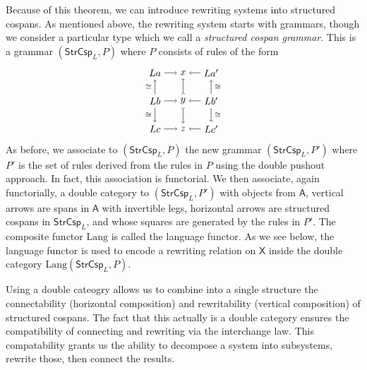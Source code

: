 \documentclass{amsart}
\newcommand{\iso}{\cong}
\newcommand{\A}{\cat{A}}
\newcommand{\X}{\cat{X}}
\newcommand{\StrCsp}{\cat{StrCsp}}
\newcommand{\Lang}{\mathrm{Lang}}
\newcommand{\cat}[1]{\mathsf{#1}}
\theoremstyle{remark}
\theoremstyle{definition}
\begin{document}
Because of this theorem, we can introduce rewriting systems into
structured cospans.  As mentioned above, the rewriting system starts
with grammars, though we consider a particular type which we call a
\emph{structured cospan grammar}.  This is a grammar
$ ( \StrCsp_L , P ) $ where $ P $ consists of rules of the form
%
 \[
   \begin{tikzpicture}
    \begin{scope}
        \node (1) at (0,2) {\( La \)};
        \node (2) at (1,2) {\( x \)};
        \node (3) at (2,2) {\( La' \)};
        \node (4) at (0,1) {\( Lb \)};
        \node (5) at (1,1) {\( y \)};
        \node (6) at (2,1) {\( Lb' \)};
        \node (7) at (0,0) {\( Lc \)};
        \node (8) at (1,0) {\( z \)};
        \node (9) at (2,0) {\( Lc' \)};
        \draw [->] (1) to node []
          {\scriptsize{\( \)}} (2);
        \draw [->] (3) to node []
          {\scriptsize{\( \)}} (2);
        \draw [->] (4) to node []
          {\scriptsize{\( \)}} (5);
        \draw [->] (6) to node []
          {\scriptsize{\( \)}} (5);
        \draw [->] (7) to node []
          {\scriptsize{\( \)}} (8);
        \draw [->] (9) to node []
          {\scriptsize{\( \)}} (8);
        \draw [->] (4) to node [left]
          {\scriptsize{\( \iso \)}} (1);
        \draw [->] (4) to node [left]
          {\scriptsize{\( \iso \)}} (7);
        \draw [>->] (5) to node []
          {\scriptsize{\( \)}} (2);
        \draw [>->] (5) to node []
          {\scriptsize{\( \)}} (8);
        \draw [->] (6) to node [right]
          {\scriptsize{\( \iso \)}} (3);
        \draw [->] (6) to node [right]
          {\scriptsize{\( \iso \)}} (9);
    \end{scope}
  \end{tikzpicture}
\]
%
As before, we associate to $ ( \StrCsp_L , P ) $ the new grammar
$ ( \StrCsp_L , P' ) $ where $ P' $ is the set of rules derived from
the rules in $ P $ using the double pushout approach.  In fact, this
association is functorial.  We then associate, again functorially, a
double category to $ ( \StrCsp_L , P' ) $ with objects from $ \A $,
vertical arrows are spans in $ \A $ with invertible legs, horizontal
arrows are structured cospans in $ \StrCsp_L $, and whose squares are
generated by the rules in $ P' $. The composite functor $ \Lang $ is
called the language functor.  As we see below, the language functor is
used to encode a rewriting relation on $ \X $ inside the double category
$ \Lang ( \StrCsp_L , P ) $.

Using a double cateogry allows us to combine into a single structure
the connectability (horizontal composition) and rewritability
(vertical composition) of structured cospans.  The fact that this
actually is a double category \cite[Lem.~4.2]{CicCour_SpCspTopos}
ensures the compatibility of connecting and rewriting via the
interchange law. This compatability grants us the ability to decompose
a system into subsystems, rewrite those, then connect the
results.
\end{document}
